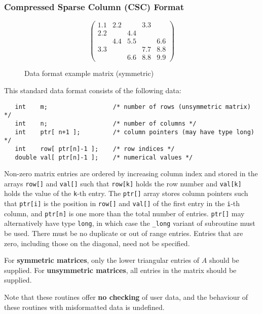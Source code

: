 \subsubsection{Compressed Sparse Column (CSC) Format} \label{cscformat}

\begin{figure}
   \caption{ \label{format eg}
      Data format example matrix (symmetric)
   }
   $$
      \left( \begin{array}{ccccc}
         1.1 & 2.2 &     & 3.3 &     \\
         2.2 &     & 4.4 &     &     \\
             & 4.4 & 5.5 &     & 6.6 \\
         3.3 &     &     & 7.7 & 8.8 \\
             &     & 6.6 & 8.8 & 9.9
      \end{array} \right)
   $$
\end{figure}

This standard data format consists of the following data:
\begin{verbatim}
   int    m;                  /* number of rows (unsymmetric matrix) */
   int    n;                  /* number of columns */
   int    ptr[ n+1 ];         /* column pointers (may have type long) */
   int    row[ ptr[n]-1 ];    /* row indices */
   double val[ ptr[n]-1 ];    /* numerical values */
\end{verbatim}
Non-zero matrix entries are ordered by increasing column index and stored in
the arrays \texttt{row[]} and \texttt{val[]} such that \texttt{row[k]} holds
the row number and \texttt{val[k]} holds the value of the \texttt{k}-th entry.
The \texttt{ptr[]} array stores column pointers such that \texttt{ptr[i]} is
the position in \texttt{row[]} and \texttt{val[]} of
the first entry in the \texttt{i}-th column, and \texttt{ptr[n]} is one more
than the total number of entries. \texttt{ptr[]} may alternatively have type
\texttt{long}, in which case the \texttt{\_long} variant of subroutine must
be used.
There must be no duplicate or out of range entries.
Entries that are zero, including those on the diagonal, need not be specified.

For \textbf{symmetric matrices}, only the lower triangular entries of $A$
should be supplied. For \textbf{unsymmetric matrices}, all entries in the matrix
should be supplied.

Note that these routines offer \textbf{no checking} of user data, and the
behaviour of these routines with misformatted data is undefined.

